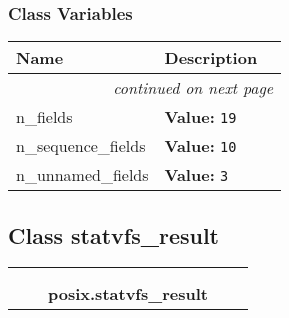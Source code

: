 
  \subsubsection{Class Variables}

    \vspace{-1cm}
\hspace{\varindent}\begin{longtable}{|p{\varnamewidth}|p{\vardescrwidth}|l}
\cline{1-2}
\cline{1-2} \centering \textbf{Name} & \centering \textbf{Description}& \\
\cline{1-2}
\endhead\cline{1-2}\multicolumn{3}{r}{\small\textit{continued on next page}}\\\endfoot\cline{1-2}
\endlastfoot\raggedright n\-\_\-f\-i\-e\-l\-d\-s\- & \raggedright \textbf{Value:} 
{\tt 19}&\\
\cline{1-2}
\raggedright n\-\_\-s\-e\-q\-u\-e\-n\-c\-e\-\_\-f\-i\-e\-l\-d\-s\- & \raggedright \textbf{Value:} 
{\tt 10}&\\
\cline{1-2}
\raggedright n\-\_\-u\-n\-n\-a\-m\-e\-d\-\_\-f\-i\-e\-l\-d\-s\- & \raggedright \textbf{Value:} 
{\tt 3}&\\
\cline{1-2}
\end{longtable}



\subsection{Class statvfs\_result}

    \label{posix:statvfs_result}
\begin{tabular}{cccccc}
\multicolumn{2}{r}{\settowidth{\BCL}{object}\multirow{2}{\BCL}{object}}
&&
  \\\cline{3-3}
  &&\multicolumn{1}{c|}{}
&&
  \\
&&\multicolumn{2}{l}{\textbf{posix.statvfs\_result}}
\end{tabular}

